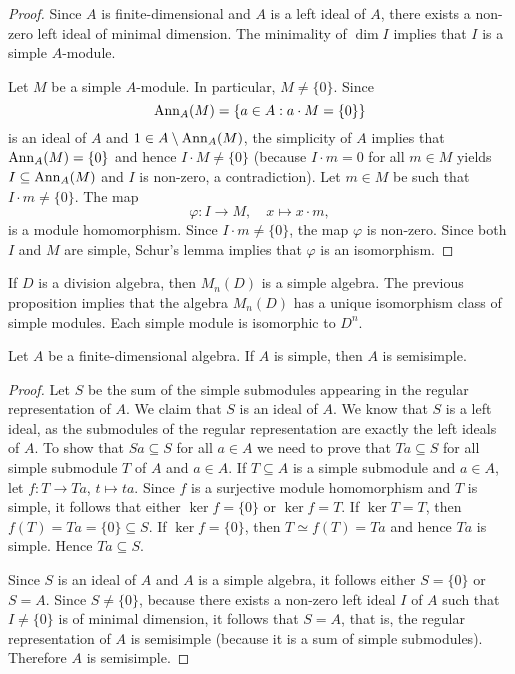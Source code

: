 \begin{proof}
	Since $A$ is finite-dimensional and $A$ is a left ideal of $A$, there exists a non-zero left ideal of minimal dimension. The minimality 
	of $\dim I$ implies that $I$ is a simple $A$-module. 
	
	Let $M$ be a simple $A$-module. In particular, $M\ne\{0\}$. 
	Since  
	\[
	\operatorname{Ann}_A(M)=\{a\in A:a\cdot M=\{0\}\}
	\]
	is an ideal of $A$ and $1\in A\setminus\operatorname{Ann}_A(M)$, the simplicity of $A$ implies that 
	$\operatorname{Ann}_A(M)=\{0\}$ and hence $I\cdot M\ne\{0\}$ (because $I\cdot m= 0$ for all $m\in M$ yields  
	$I\subseteq\operatorname{Ann}_A(M)$ and $I$ is non-zero, a contradiction). Let $m\in M$ be such 
	that $I\cdot m\ne\{0\}$. The map 
	\[
	\varphi\colon I\to M,\quad
	x\mapsto x\cdot m,
	\]
	is a module homomorphism. Since $I\cdot m\ne\{0\}$, the map $\varphi$ is non-zero. 
	Since both $I$ and $M$ are simple, Schur's lemma implies that $\varphi$ is an isomorphism. 
\end{proof}

If $D$ is a division algebra, then $M_n(D)$ is a simple algebra. The previous proposition
implies that the algebra $M_n(D)$ has a unique isomorphism class of simple modules. Each simple module
is isomorphic to $D^n$. 

\begin{proposition}
    Let $A$ be a finite-dimensional algebra. 
    If $A$ is simple, then $A$ is semisimple. 
\end{proposition}

\begin{proof}
	Let $S$ be the sum of the simple submodules appearing in the regular representation of $A$. 
	We claim that $S$ is an ideal of $A$. We know that $S$ is a left ideal, as the submodules of the regular representation
	are exactly the left ideals of $A$. To show that $Sa\subseteq S$ for all $a\in A$ we need to prove that 
	$Ta\subseteq S$ for all simple submodule $T$ of $A$ and $a\in A$. 
	If $T\subseteq A$ is a simple submodule and $a\in A$, 
	let $f\colon T\to Ta$, $t\mapsto ta$. Since $f$ is a surjective 
	module homomorphism and $T$ is simple, it follows that
	either $\ker f=\{0\}$ or $\ker f=T$. If $\ker T=T$, then 
	$f(T)=Ta=\{0\}\subseteq S$. If $\ker f=\{0\}$, then $T\simeq f(T)=Ta$ and hence $Ta$ is simple. Hence $Ta\subseteq S$. 
	
	Since $S$ is an ideal of $A$ and $A$
	is a simple algebra, it follows either $S=\{0\}$ or $S=A$.  Since $S\ne\{0\}$, because  
	there exists a non-zero left ideal $I$ of $A$ such that $I\ne\{0\}$ is of minimal dimension, 
	it follows that $S=A$, that is, the regular representation of $A$ is semisimple (because it is a sum of simple submodules). Therefore 
	$A$ is semisimple. 
\end{proof}

